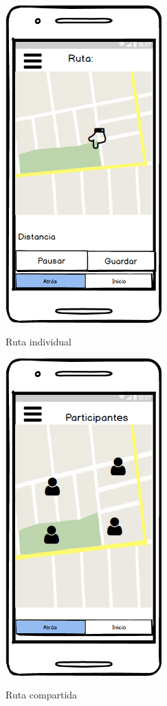 	\begin{figure}[htbp]
\begin{minipage}[b]{0.5\linewidth} %
\centering
\includegraphics[width=6cm]{maqueta/Trayecto-actual.png}
 \label{figura1}
\caption{Ruta individual}

\end{minipage}
\hspace{0.5cm} %
\begin{minipage}[b]{0.5\linewidth}
\centering
\includegraphics[width=6cm]{maqueta/Trayecto-actual-compartido.png}
 \label{figura2}
\caption{Ruta compartida}

\end{minipage}
\end{figure}


